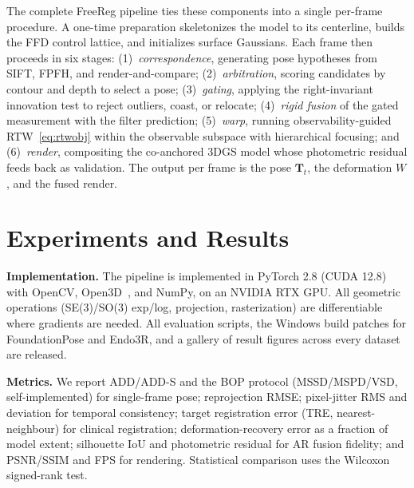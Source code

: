 \documentclass[9pt,twoside,web]{ieeecolor2}
\begin{document}
The complete FreeReg pipeline ties these components into a single per-frame procedure. A one-time preparation skeletonizes the model to its centerline, builds the FFD control lattice, and initializes surface Gaussians. Each frame then proceeds in six stages: (1)~\emph{correspondence}, generating pose hypotheses from SIFT, FPFH, and render-and-compare; (2)~\emph{arbitration}, scoring candidates by contour and depth to select a pose; (3)~\emph{gating}, applying the right-invariant innovation test to reject outliers, coast, or relocate; (4)~\emph{rigid fusion} of the gated measurement with the filter prediction; (5)~\emph{warp}, running observability-guided RTW~\eqref{eq:rtwobj} within the observable subspace with hierarchical focusing; and (6)~\emph{render}, compositing the co-anchored 3DGS model whose photometric residual feeds back as validation. The output per frame is the pose $\mathbf{T}_{t}$, the deformation $W$, and the fused render.

\section{Experiments and Results}\label{sec:exp}


\textbf{Implementation.} The pipeline is implemented in PyTorch 2.8 (CUDA 12.8) with OpenCV, Open3D~\cite{zhou2018open3d}, and NumPy, on an NVIDIA RTX GPU. All geometric operations (SE(3)/SO(3) exp/log, projection, rasterization) are differentiable where gradients are needed. All evaluation scripts, the Windows build patches for FoundationPose and Endo3R, and a gallery of result figures across every dataset are released.

\textbf{Metrics.} We report ADD/ADD-S and the BOP protocol (MSSD/MSPD/VSD, self-implemented) for single-frame pose; reprojection RMSE; pixel-jitter RMS and deviation for temporal consistency; target registration error (TRE, nearest-neighbour) for clinical registration; deformation-recovery error as a fraction of model extent; silhouette IoU and photometric residual for AR fusion fidelity; and PSNR/SSIM and FPS for rendering. Statistical comparison uses the Wilcoxon signed-rank test.
\end{document}

